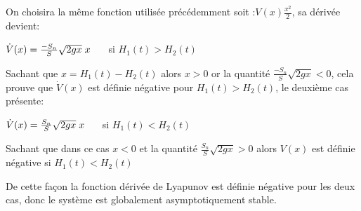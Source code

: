 	\par On choisira la même fonction utilisée précédemment soit :$ V(x) \frac{x^2}{2} $, sa dérivée devient:
	 
	\begin{center}
	
		$ \dot{V} (x) = \frac{-S_n}{S} \sqrt{2gx} \hspace{1mm} x  \hspace {0.5 cm} $ si $H_1(t) > H_2(t) $	
	 
	\end{center}
	\par Sachant que $x=H_1(t) - H_2(t)$ alors $x>0$ or la quantité $\frac{-S_n}{S} \sqrt{2gx}<0$, cela prouve que $\dot{V}(x)$ est définie négative pour $H_1(t) > H_2(t)$, le deuxième cas présente:  
	
	\begin{center}
	
		$ \dot{V} (x) = \frac{S_n}{S} \sqrt{2gx}\hspace{1mm} x \hspace{0.5 cm}$ si $H_1(t) < H_2(t) $
			
	\end{center}
	
	\par Sachant que dans ce cas $x<0$ et la quantité $\frac{S_n}{S} \sqrt{2gx}>0$ alors $V(x)$ est définie négative si $H_1(t) < H_2(t)$
	\par De cette façon la fonction dérivée de Lyapunov est définie négative pour les deux cas, donc le système est globalement asymptotiquement stable. 
	 